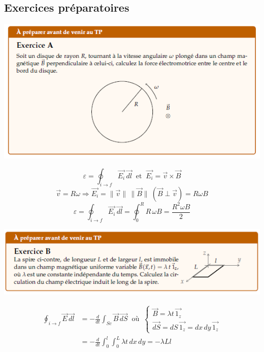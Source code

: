\documentclass	[11pt, a4paper, openany]{book}
\begin{document}
		\subsection{Exercices préparatoires}
		\begin{center}
			\includegraphics[scale=1]{prepa/exoA.png}\\
		\end{center}
		$$\varepsilon=\oint_{i\rightarrow f}\vec{E_i}\,\vec{dl}\ \text{  et  }\  \vec{E_i}=\vec v\times\vec B$$
		$$\vec v=R\omega\Rightarrow \vec{E_i}=\|\vec v\|\,\|\vec B\|\  (\vec{B} \perp \vec{v})=R\omega B$$
		$$\varepsilon=\oint_{i\rightarrow f}\vec{E_i}\,\vec{dl}=\oint_0^RR\,\omega B=\frac{R^2\omega B}{2}$$
		\begin{center}
			\includegraphics[scale=1]{prepa/exoB.png}\\
		\end{center}
		\begin{align*}\oint_{i\rightarrow f}\vec{E}\,\vec{dl} & =-\frac{d}{dt}\int_{Sc}\vec B\,\vec{dS}\ \text{ où }\ \left\{\begin{array}{l}
			\vec B=\lambda t\,\vec{1_z}\\
			\vec{dS}=dS\,\vec{1_z}=dx\,dy\,\vec{1_z}\end{array}\right.\\
			& =-\frac{d}{dt}\int_0^l\int_0^L\lambda t\,dx\,dy=-\lambda L l\end{align*}
			
\end{document}
